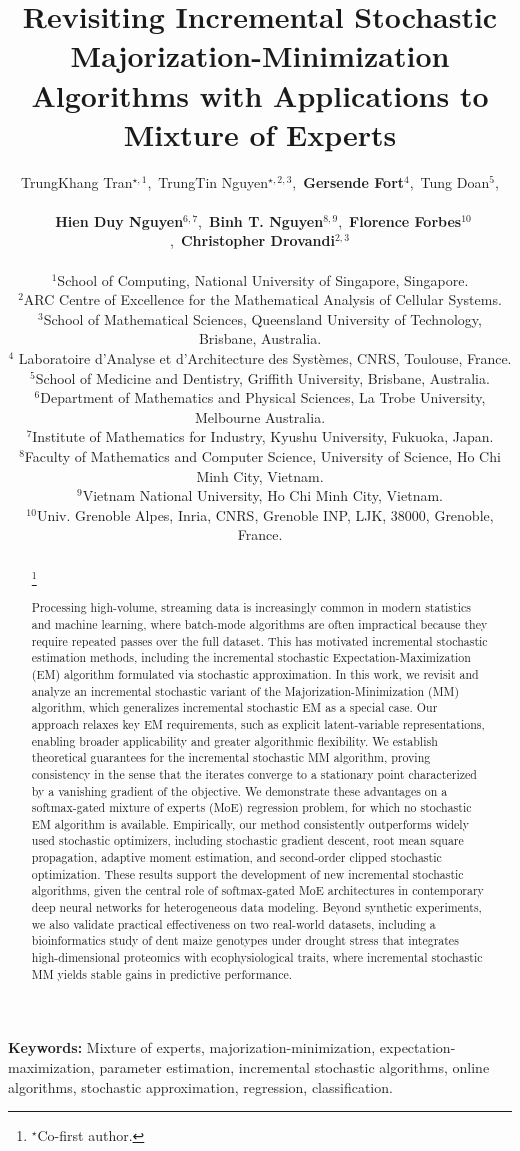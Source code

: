 \documentclass{article}
\title{Revisiting Incremental Stochastic Majorization-Minimization Algorithms with Applications to Mixture of Experts}
\author{TrungKhang Tran$^{\star,1}$,~TrungTin Nguyen$^{\star ,2,3}$,~\textbf{Gersende Fort}$^{4}$,~Tung Doan$^{5}$,\\\\
	~\textbf{Hien Duy Nguyen}$^{6,7}$,~\textbf{Binh T. Nguyen}$^{8,9}$,~\textbf{Florence Forbes}$^{10}$,~\textbf{Christopher Drovandi}$^{2,3}$
	\\\\
	$^{1}$School of Computing, National University of Singapore, Singapore.\\
	$^{2}$ARC Centre of Excellence for the Mathematical Analysis of Cellular Systems. \\
	$^{3}$School of Mathematical Sciences, Queensland University of Technology, Brisbane, Australia.
	\\
	$^{4}$ Laboratoire d'Analyse et d'Architecture des Systèmes, CNRS, Toulouse, France.\\
	$^{5}$School of Medicine and Dentistry, Griffith University, Brisbane, Australia.\\
	$^{6}$Department of Mathematics and Physical Sciences, La Trobe University, Melbourne Australia.\\
	$^{7}$Institute of Mathematics for Industry, Kyushu University, Fukuoka, Japan.\\ 
	$^{8}$Faculty of Mathematics and Computer Science, University of Science, Ho Chi Minh City, Vietnam.\\
	$^{9}$Vietnam National University, Ho Chi Minh City, Vietnam.\\
	$^{10}$Univ. Grenoble Alpes, Inria, CNRS, Grenoble INP, LJK, 38000, Grenoble, France.\\
}
\newcommand\blfootnote[1]{%
  \begingroup
  \renewcommand\thefootnote{}\footnote{#1}%
  \addtocounter{footnote}{-1}%
  \endgroup
}
\begin{document}
\maketitle


\begin{abstract}
\blfootnote{$^{\star}$Co-first author.}

Processing high-volume, streaming data is increasingly common in modern statistics and machine learning, where batch-mode algorithms are often impractical because they require repeated passes over the full dataset. This has motivated incremental stochastic estimation methods, including the incremental stochastic Expectation-Maximization (EM) algorithm formulated via stochastic approximation. In this work, we revisit and analyze an incremental stochastic variant of the Majorization-Minimization (MM) algorithm, which generalizes incremental stochastic EM as a special case. Our approach relaxes key EM requirements, such as explicit latent-variable representations, enabling broader applicability and greater algorithmic flexibility. We establish theoretical guarantees for the incremental stochastic MM algorithm, proving consistency in the sense that the iterates converge to a stationary point characterized by a vanishing gradient of the objective. We demonstrate these advantages on a softmax-gated mixture of experts (MoE) regression problem, for which no stochastic EM algorithm is available. Empirically, our method consistently outperforms widely used stochastic optimizers, including stochastic gradient descent, root mean square propagation, adaptive moment estimation, and second-order clipped stochastic optimization. These results support the development of new incremental stochastic algorithms, given the central role of softmax-gated MoE architectures in contemporary deep neural networks for heterogeneous data modeling. Beyond synthetic experiments, we also validate practical effectiveness on two real-world datasets, including a bioinformatics study of dent maize genotypes under drought stress that integrates high-dimensional proteomics with ecophysiological traits, where incremental stochastic MM yields stable gains in predictive performance.




\end{abstract}

{\bf Keywords:} Mixture of experts, majorization-minimization, expectation-maximization, parameter estimation, incremental stochastic algorithms, online algorithms, stochastic approximation, regression, classification.
\end{document}
